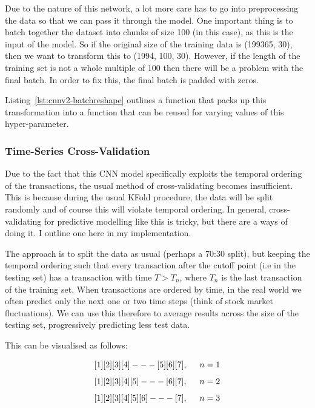 \documentclass[12pt,a4paper,twoside]{report}
\begin{document}
Due to the nature of this network, a lot more care has to go into preprocessing the data so that we can pass it through the model. One important thing is to batch together the dataset into chunks of size 100 (in this case), as this is the input of the model. So if the original size of the training data is (199365, 30), then we want to transform this to (1994, 100, 30). However, if the length of the training set is not a whole multiple of 100 then there will be a problem with the final batch. In order to fix this, the final batch is padded with zeros. 

Listing~\ref{lst:cnnv2-batchreshape} outlines a function that packs up this transformation into a function that can be reused for varying values of this hyper-parameter.



\subsubsection{Time-Series Cross-Validation}

Due to the fact that this CNN model specifically exploits the temporal ordering of the transactions, the usual method of cross-validating becomes insufficient. This is because during the usual KFold procedure, the data will be split randomly and of course this will violate temporal ordering. In general, cross-validating for predictive modelling like this is tricky, but there are a ways of doing it. I outline one here in my implementation. 

The approach is to split the data as usual (perhaps a 70:30 split), but keeping the temporal ordering such that every transaction after the cutoff point (i.e in the testing set) has a transaction with time $T > T_{n} $, where $T_{n}$ is the last transaction of the training set. When transactions are ordered by time, in the real world we often predict only the next one or two time steps (think of stock market fluctuations). We can use this therefore to average results across the size of the testing set, progressively predicting less test data. 

This can be visualised as follows:

$$ [1] [2] [3] [4]  --- [5] [6] [7] , \hspace{5mm}  n=1$$
$$ [1] [2] [3] [4] [5] --- [6] [7] ,\hspace{5mm}  n=2$$
$$ [1] [2] [3] [4] [5] [6] --- [7] ,\hspace{5mm}  n=3$$
\end{document}
